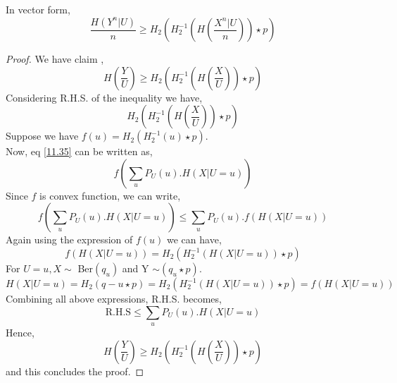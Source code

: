\documentclass{article}
\begin{document}
In vector form,
\begin{equation}
	\frac{H\left( Y^{n}|U \right)}{n} \geq H_2\left( H_{2}^{-1}\left( H\left(\frac{ X^{n}|U}{n}\right)\right) \star p\right)
\end{equation}

\begin{proof}
We have claim ,
\begin{equation}
	H\left(\frac{Y}{U}\right) \geq H_2\left( H_{2}^{-1}\left( H\left( \frac{X}{U}\right)\right) \star p\right)
\end{equation}
Considering R.H.S. of the inequality we have, 
\begin{equation}
 H_2\left( H_{2}^{-1}\left( H\left( \frac{X}{U}\right)\right) \star p\right) \label{11.35}
\end{equation}
Suppose we have $f(u) = H_{2} \left( H_{2}^{-1}(u)\star p\right)$.\\
Now, eq \eqref{11.35} can be written as, 
\begin{equation}
f \left( \sum_{u} P_{U}(u). H \left( X | U = u\right)\right)
\end{equation}
Since $f$ is convex function, we can write,
\begin{equation}
f \left( \sum_{u} P_{U}(u). H \left( X | U = u\right)\right) \leq   \sum_{u} P_{U}(u). f \left(H \left( X | U = u\right)\right) 
\end{equation}
Again using the expression of $f(u)$ we can have,
\begin{equation}
	f\left(H\left( X|U=u\right)\right) =  H_{2} \left( H_{2}^{-1}\left(H\left( X|U=u\right)\right)\star p\right)
\end{equation}
 For $U = u, X \sim $ Ber$(q_{u})$ and Y $\sim (q_{u} \star p)$.
 \begin{equation}
 H\left( X|U=u\right) = H_{2}\left(q-{u} \star p\right) = H_{2} \left( H_{2}^{-1}\left(H\left( X|U=u\right)\right)\star p\right) = 	f\left(H\left( X|U=u\right)\right)
 \end{equation} 
Combining all above expressions, R.H.S. becomes, 
\begin{equation}
	\text{R.H.S} \leq  \sum_{u} P_{U}(u). H \left( X | U = u\right)
\end{equation}
Hence,
\begin{equation}
	H\left(\frac{Y}{U}\right) \geq H_2\left( H_{2}^{-1}\left( H\left( \frac{X}{U}\right)\right) \star p\right)
\end{equation}
and this concludes the proof.
\end{proof}
\end{document}
